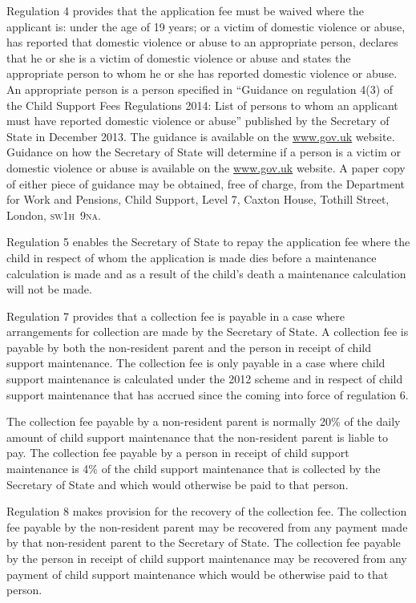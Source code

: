 \documentclass[12pt,a4paper]{article}
\begin{document}
Regulation 4 provides that the application fee must be waived where the applicant is: under the age of 19 years; or a victim of domestic violence or abuse, has reported that domestic violence or abuse to an appropriate person, declares that he or she is a victim of domestic violence or abuse and states the appropriate person to whom he or she has reported domestic violence or abuse. An appropriate person is a person specified in “Guidance on regulation 4(3) of the Child Support Fees Regulations 2014: List of persons to whom an applicant must have reported domestic violence or abuse” published by the Secretary of State in December 2013. The guidance is available on the \url{www.gov.uk} website. Guidance on how the Secretary of State will determine if a person is a victim or domestic violence or abuse is available on the \url{www.gov.uk} website. A paper copy of either piece of guidance may be obtained, free of charge, from the Department for Work and Pensions, Child Support, Level 7, Caxton House, Tothill Street, London, \textsc{\lowercase{SW1H~9NA}}.

Regulation 5 enables the Secretary of State to repay the application fee where the child in respect of whom the application is made dies before a maintenance calculation is made and as a result of the child’s death a maintenance calculation will not be made.

Regulation 7 provides that a collection fee is payable in a case where arrangements for collection are made by the Secretary of State. A collection fee is payable by both the non-resident parent and the person in receipt of child support maintenance. The collection fee is only payable in a case where child support maintenance is calculated under the 2012 scheme and in respect of child support maintenance that has accrued since the coming into force of regulation 6.

The collection fee payable by a non-resident parent is normally 20\% of the daily amount of child support maintenance that the non-resident parent is liable to pay. The collection fee payable by a person in receipt of child support maintenance is 4\% of the child support maintenance that is collected by the Secretary of State and which would otherwise be paid to that person.

Regulation 8 makes provision for the recovery of the collection fee. The collection fee payable by the non-resident parent may be recovered from any payment made by that non-resident parent to the Secretary of State. The collection fee payable by the person in receipt of child support maintenance may be recovered from any payment of child support maintenance which would be otherwise paid to that person.
\end{document}

